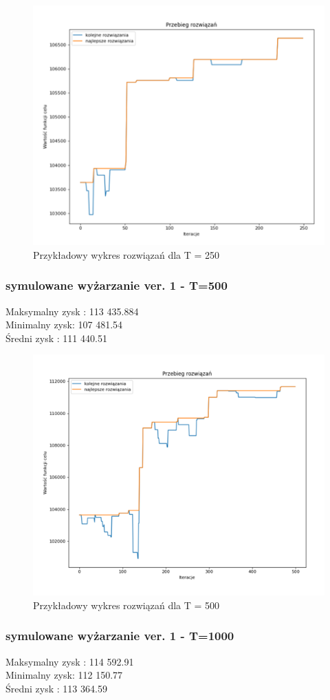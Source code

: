 \documentclass{article}
\begin{document}
\begin{figure}[H]
	\centering
	\includegraphics[width=0.7\linewidth]{screens/AnneallingV1_250}
	\caption{Przykładowy wykres rozwiązań dla T = 250}
	\label{fig:anneallingv1250}
\end{figure}


\subsubsection{symulowane wyżarzanie ver. 1 - T=500}
Maksymalny zysk : 113 435.884\\
Minimalny zysk: 107 481.54\\
Średni zysk : 111 440.51\\

\begin{figure}[H]
	\centering
	\includegraphics[width=0.7\linewidth]{screens/AnneallingV1_500}
	\caption{Przykładowy wykres rozwiązań dla T = 500}
	\label{fig:anneallingv1500}
\end{figure}


\subsubsection{symulowane wyżarzanie ver. 1 - T=1000}
Maksymalny zysk : 114 592.91\\
Minimalny zysk: 112 150.77\\
Średni zysk : 113 364.59\\
\end{document}
